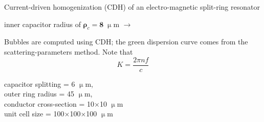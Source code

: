 \documentclass[t]{beamer} \usepackage[english]{babel} \usepackage[utf8]{inputenc} \usetheme{Frankfurt} %
\begin{document}
\begin{frame}[plain]{}%
\begin{columns}[T] %
	\begin{column}{.55\textwidth}
	\vspace{3mm}
	\noindent Current-driven homogenization (CDH) of an electro-magnetic split-ring resonator 
	\begin{exampleblock}\hfill inner capacitor radius of $\pmb\rho_c=\pmb{8}\;\upmu$m $\rightarrow$\end{exampleblock}
	\vspace{3mm}

	\noindent Bubbles are computed using CDH; the green dispersion curve comes from the scattering-parameters method. Note that $$K = \frac{2\pi n f}{c}$$
	\vspace{12mm}

	\small{capacitor splitting = 6 $\upmu$m,\\ outer ring radius = 45 $\upmu$m,\\ conductor cross-section = 10$\times$10 $\upmu$m\\ unit cell size = 100$\times$100$\times$100 $\upmu$m}
	\vspace{5mm}


\end{column}
\end{columns}
\end{frame}
\end{document}
